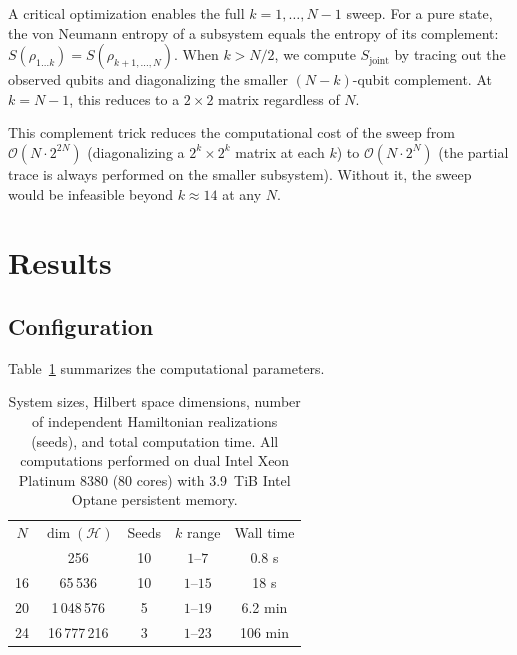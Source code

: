\documentclass[aps,pra,twocolumn,superscriptaddress,floatfix]{revtex4-2}
\begin{document}
A critical optimization enables the full $k = 1, \ldots, N-1$ sweep.
For a pure state, the von Neumann entropy of a subsystem equals the entropy of its complement: $S(\rho_{1\ldots k}) = S(\rho_{k+1,\ldots,N})$.
When $k > N/2$, we compute $S_{\mathrm{joint}}$ by tracing out the observed qubits and diagonalizing the smaller $(N-k)$-qubit complement.
At $k = N-1$, this reduces to a $2 \times 2$ matrix regardless of $N$.

This complement trick reduces the computational cost of the sweep from $\mathcal{O}(N \cdot 2^{2N})$ (diagonalizing a $2^k \times 2^k$ matrix at each $k$) to $\mathcal{O}(N \cdot 2^N)$ (the partial trace is always performed on the smaller subsystem).
Without it, the sweep would be infeasible beyond $k \approx 14$ at any $N$.


\section{Results}
\label{sec:results}

\subsection{Configuration}

Table~\ref{tab:config} summarizes the computational parameters.

\begin{table}[b]
\caption{System sizes, Hilbert space dimensions, number of independent Hamiltonian realizations (seeds), and total computation time. All computations performed on dual Intel Xeon Platinum 8380 (80 cores) with 3.9~TiB Intel Optane persistent memory.}
\label{tab:config}
\begin{ruledtabular}
\begin{tabular}{ccccc}
$N$ & $\dim(\mathcal{H})$ & Seeds & $k$ range & Wall time \\
\colrule
8 & 256 & 10 & $1$--$7$ & 0.8 s \\
16 & 65\,536 & 10 & $1$--$15$ & 18 s \\
20 & 1\,048\,576 & 5 & $1$--$19$ & 6.2 min \\
24 & 16\,777\,216 & 3 & $1$--$23$ & 106 min \\
\end{tabular}
\end{ruledtabular}
\end{table}
\end{document}

